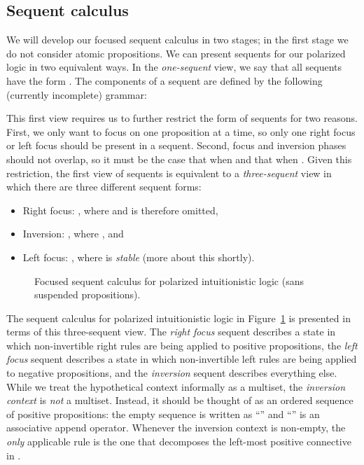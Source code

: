 \documentclass[acmtocl]{robtrans}\pdfoutput=1
\begin{document}
\subsection{Sequent calculus}\label{sec:logic-scalc}

We will develop our focused sequent calculus in two stages; in the
first stage we do not consider atomic propositions. We can present
sequents for our polarized logic in two equivalent ways. In the {\it
  one-sequent} view, we say that all sequents have the form
. The components of a sequent are defined by the
following (currently incomplete) grammar:

This first view requires us to further restrict the form of sequents
for two reasons. First, we only want to focus on one proposition at a
time, so only one right focus  or left focus  should be
present in a sequent.  Second, focus and inversion phases should not
overlap, so it must be the case that  when  and
that  when . Given this
restriction, the first view of sequents is equivalent to a {\it
  three-sequent} view in which there are three different sequent
forms:
\begin{itemize}
\item Right focus: , where  and is
  therefore omitted,
\item Inversion: , where , and
\item Left focus: , where  is {\it stable}
  (more about this shortly).
\end{itemize}

\begin{figure}




\medskip
{}







\medskip
{}



\medskip
\fbox{}
\vspace{-12pt}

\caption{Focused sequent calculus for polarized intuitionistic logic
  (sans suspended propositions).}
\label{fig:foc}
\end{figure}


The sequent calculus for polarized intuitionistic logic in
Figure~\ref{fig:foc} is presented in terms of this three-sequent view.
The {\it right focus} sequent  describes a state
in which non-invertible right rules are being applied to positive
propositions, the {\it left focus} sequent 
describes a state in which non-invertible left rules are being applied
to negative propositions, and the {\it inversion} sequent
 describes everything else. While we treat
the hypothetical context  informally as a multiset, the {\it
  inversion context}  is {\it not} a multiset. Instead, it
should be thought of as an ordered sequence of positive propositions:
the empty sequence is written as ``'' and ``'' is an
associative append operator.  Whenever the inversion context  is
non-empty, the {\it only} applicable rule is the one that decomposes
the left-most positive connective in .
\end{document}

